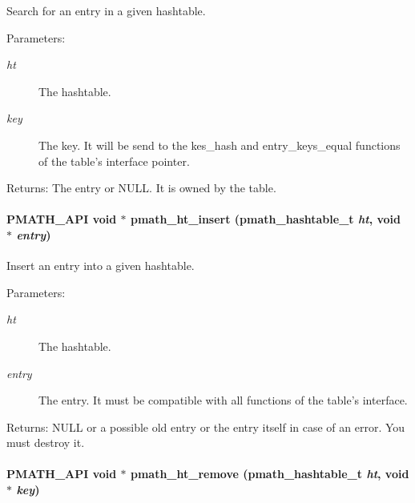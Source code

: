 Search for an entry in a given hashtable. 

\begin{Desc}
\item[Parameters:]
\begin{description}
\item[{\em ht}]The hashtable. \item[{\em key}]The key. It will be send to the kes\_\-hash and entry\_\-keys\_\-equal functions of the table's interface pointer. \end{description}
\end{Desc}
\begin{Desc}
\item[Returns:]The entry or NULL. It is owned by the table. \end{Desc}
\hypertarget{group__hashtables_ged2c72c01c0c883154d77ddb6f42dd05}{
\paragraph[{pmath\_\-ht\_\-insert}]{\setlength{\rightskip}{0pt plus 5cm}PMATH\_\-API void $\ast$ pmath\_\-ht\_\-insert ({\bf pmath\_\-hashtable\_\-t} {\em ht}, \/  void $\ast$ {\em entry})}\hfill}
\label{group__hashtables_ged2c72c01c0c883154d77ddb6f42dd05}


Insert an entry into a given hashtable. 

\begin{Desc}
\item[Parameters:]
\begin{description}
\item[{\em ht}]The hashtable. \item[{\em entry}]The entry. It must be compatible with all functions of the table's interface. \end{description}
\end{Desc}
\begin{Desc}
\item[Returns:]NULL or a possible old entry or the entry itself in case of an error. You must destroy it. \end{Desc}
\hypertarget{group__hashtables_gc0825f215931052b62d62abd574e0047}{
\paragraph[{pmath\_\-ht\_\-remove}]{\setlength{\rightskip}{0pt plus 5cm}PMATH\_\-API void $\ast$ pmath\_\-ht\_\-remove ({\bf pmath\_\-hashtable\_\-t} {\em ht}, \/  void $\ast$ {\em key})}\hfill}
\label{group__hashtables_gc0825f215931052b62d62abd574e0047}


